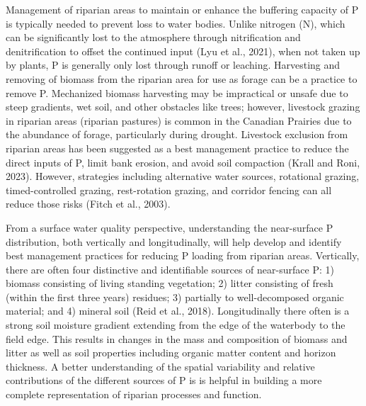 \documentclass[
]{agujournal2019}
\begin{document}
Management of riparian areas to maintain or enhance the buffering
capacity of P is typically needed to prevent loss to water bodies.
Unlike nitrogen (N), which can be significantly lost to the atmosphere
through nitrification and denitrification to offset the continued input
(Lyu et al., 2021), when not taken up by plants, P is generally only
lost through runoff or leaching. Harvesting and removing of biomass from
the riparian area for use as forage can be a practice to remove P.
Mechanized biomass harvesting may be impractical or unsafe due to steep
gradients, wet soil, and other obstacles like trees; however, livestock
grazing in riparian areas (riparian pastures) is common in the Canadian
Prairies due to the abundance of forage, particularly during drought.
Livestock exclusion from riparian areas has been suggested as a best
management practice to reduce the direct inputs of P, limit bank
erosion, and avoid soil compaction (Krall and Roni, 2023). However,
strategies including alternative water sources, rotational grazing,
timed-controlled grazing, rest-rotation grazing, and corridor fencing
can all reduce those risks (Fitch et al., 2003).

From a surface water quality perspective, understanding the near-surface
P distribution, both vertically and longitudinally, will help develop
and identify best management practices for reducing P loading from
riparian areas. Vertically, there are often four distinctive and
identifiable sources of near-surface P: 1) biomass consisting of living
standing vegetation; 2) litter consisting of fresh (within the first
three years) residues; 3) partially to well-decomposed organic material;
and 4) mineral soil (Reid et al., 2018). Longitudinally there often is a
strong soil moisture gradient extending from the edge of the waterbody
to the field edge. This results in changes in the mass and composition
of biomass and litter as well as soil properties including organic
matter content and horizon thickness. A better understanding of the
spatial variability and relative contributions of the different sources
of P is is helpful in building a more complete representation of
riparian processes and function.
\end{document}
